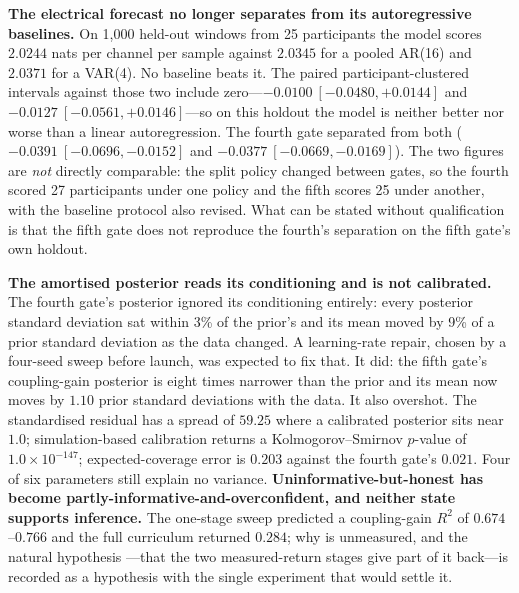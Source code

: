 \textbf{The electrical forecast no longer separates from its autoregressive
baselines.} On 1{,}000 held-out windows from 25 participants the model scores
\(2.0244\) nats per channel per sample against \(2.0345\) for a pooled AR(16) and
\(2.0371\) for a VAR(4). No baseline beats it. The paired participant-clustered
intervals against those two include zero---\(-0.0100\ [-0.0480, +0.0144]\) and
\(-0.0127\ [-0.0561, +0.0146]\)---so on this holdout the model is neither better
nor worse than a linear autoregression. The fourth gate separated from both
(\(-0.0391\ [-0.0696,-0.0152]\) and \(-0.0377\ [-0.0669,-0.0169]\)). The two
figures are \emph{not} directly comparable: the split policy changed between
gates, so the fourth scored 27 participants under one policy and the fifth scores
25 under another, with the baseline protocol also revised. What can be stated
without qualification is that the fifth gate does not reproduce the fourth's
separation on the fifth gate's own holdout.

\textbf{The amortised posterior reads its conditioning and is not calibrated.}
The fourth gate's posterior ignored its conditioning entirely: every posterior
standard deviation sat within 3\% of the prior's and its mean moved by 9\% of a
prior standard deviation as the data changed. A learning-rate repair, chosen by a
four-seed sweep before launch, was expected to fix that. It did: the fifth gate's
coupling-gain posterior is eight times narrower than the prior and its mean now
moves by \(1.10\) prior standard deviations with the data. It also overshot. The
standardised residual has a spread of \(59.25\) where a calibrated posterior sits
near \(1.0\); simulation-based calibration returns a Kolmogorov--Smirnov
\(p\)-value of \(1.0 \times 10^{-147}\); expected-coverage error is \(0.203\)
against the fourth gate's \(0.021\). Four of six parameters still explain no
variance. \textbf{Uninformative-but-honest has become
partly-informative-and-overconfident, and neither state supports inference.} The
one-stage sweep predicted a coupling-gain \(R^2\) of \(0.674\)--\(0.766\) and the
full curriculum returned \(0.284\); why is unmeasured, and the natural hypothesis
---that the two measured-return stages give part of it back---is recorded as a
hypothesis with the single experiment that would settle it.

